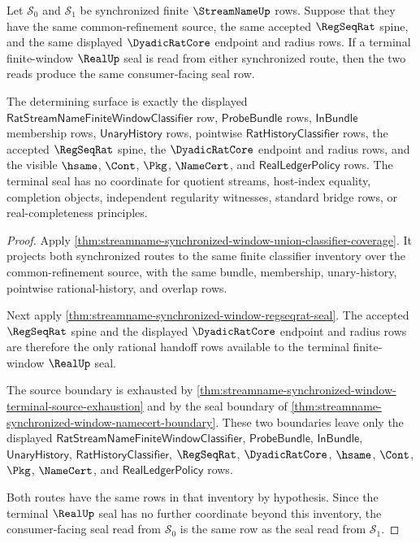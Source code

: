 \begin{theorem}
\label{thm:streamname-regseqrat-common-window-terminal-seal-determinacy}
Let $\mathcal S_0$ and $\mathcal S_1$ be synchronized finite
$\StreamNameUp$ rows. Suppose that they have the same common-refinement
source, the same accepted $\RegSeqRat$ spine, and the same displayed
$\DyadicRatCore$ endpoint and radius rows. If a terminal finite-window
$\RealUp$ seal is read from either synchronized route, then the two reads
produce the same consumer-facing seal row.

The determining surface is exactly the displayed
$\mathsf{RatStreamNameFiniteWindowClassifier}$ row, $\mathsf{ProbeBundle}$
rows, $\mathsf{InBundle}$ membership rows, $\mathsf{UnaryHistory}$ rows,
pointwise $\mathsf{RatHistoryClassifier}$ rows, the accepted $\RegSeqRat$
spine, the $\DyadicRatCore$ endpoint and radius rows, and the visible
$\hsame$, $\Cont$, $\Pkg$, $\NameCert$, and
$\mathsf{RealLedgerPolicy}$ rows. The terminal seal has no coordinate for
quotient streams, host-index equality, completion objects, independent
regularity witnesses, standard bridge rows, or real-completeness principles.
\end{theorem}
\begin{proof}
Apply
\autoref{thm:streamname-synchronized-window-union-classifier-coverage}. It
projects both synchronized routes to the same finite classifier inventory over
the common-refinement source, with the same bundle, membership,
unary-history, pointwise rational-history, and overlap rows.

Next apply \autoref{thm:streamname-synchronized-window-regseqrat-seal}. The
accepted $\RegSeqRat$ spine and the displayed $\DyadicRatCore$ endpoint and
radius rows are therefore the only rational handoff rows available to the
terminal finite-window $\RealUp$ seal.

The source boundary is exhausted by
\autoref{thm:streamname-synchronized-window-terminal-source-exhaustion} and by
the seal boundary of
\autoref{thm:streamname-synchronized-window-namecert-boundary}. These two
boundaries leave only the displayed
$\mathsf{RatStreamNameFiniteWindowClassifier}$, $\mathsf{ProbeBundle}$,
$\mathsf{InBundle}$, $\mathsf{UnaryHistory}$,
$\mathsf{RatHistoryClassifier}$, $\RegSeqRat$, $\DyadicRatCore$, $\hsame$,
$\Cont$, $\Pkg$, $\NameCert$, and $\mathsf{RealLedgerPolicy}$ rows.

Both routes have the same rows in that inventory by hypothesis. Since the
terminal $\RealUp$ seal has no further coordinate beyond this inventory, the
consumer-facing seal read from $\mathcal S_0$ is the same row as the seal read
from $\mathcal S_1$.
\end{proof}

